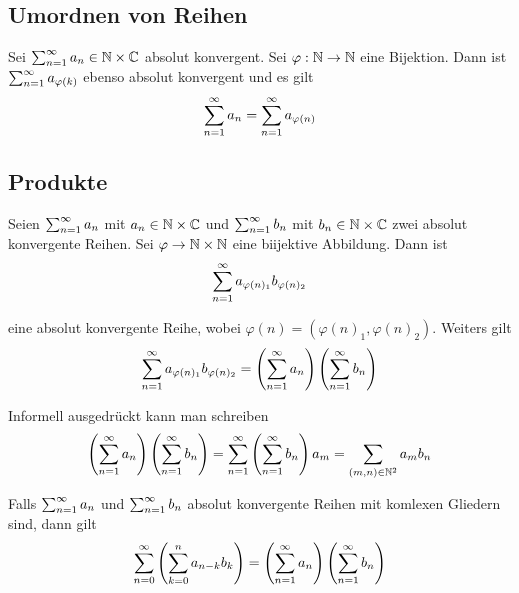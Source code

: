 
\subsection{Umordnen von Reihen}

\setcounter{thm}{34}
\begin{thm}
	Sei $\sum_{n=1}^{\infty} a_n \in \mathbb{N} \times \mathbb{C}$ absolut konvergent. Sei $\varphi: \mathbb{N} \to \mathbb{N}$ eine Bijektion. Dann ist $\sum_{n=1}^{\infty} a_{\varphi(k)}$ ebenso absolut konvergent und es gilt
	\begin{equation}
		\sum_{n=1}^{\infty} a_n = \sum_{n=1}^{\infty} a_{\varphi(n)}
	\end{equation}
\end{thm}

\subsection{Produkte} 

\begin{thm}
	
	Seien $\sum_{n=1}^{\infty} a_n$ mit $a_n \in \mathbb{N} \times \mathbb{C}$ und $\sum_{n=1}^{\infty} b_n$ mit $b_n \in \mathbb{N} \times \mathbb{C}$ zwei absolut konvergente Reihen. Sei $\varphi \to \mathbb{N} \times \mathbb{N}$ eine biijektive Abbildung. Dann ist
	\begin{equation}
		\sum_{n=1}^{\infty} a_{\varphi(n)_1} b_{\varphi(n)_2} 
	\end{equation}
	
	eine absolut konvergente Reihe, wobei $\varphi (n) = (\varphi(n)_1, \varphi(n)_2)$. Weiters gilt
	\begin{equation}
		\sum_{n=1}^{\infty} a_{\varphi(n)_1} b_{\varphi(n)_2} = \left( \sum_{n=1}^{\infty} a_n \right) \left( \sum_{n=1}^{\infty} b_n \right)
	\end{equation}
	
	Informell ausgedrückt kann man schreiben
	\begin{equation}
		\left( \sum_{n=1}^{\infty} a_n \right) \left( \sum_{n=1}^{\infty} b_n \right) =
	  \sum_{n=1}^{\infty} \left( \sum_{n=1}^{\infty} b_n \right) a_m =
	  \sum_{(m,n) \in \mathbb{N}^2} a_m b_n
	\end{equation}
\end{thm}


\setcounter{thm}{36}
\begin{thm}
	Falls $\sum_{n=1}^{\infty} a_n$ und $\sum_{n=1}^{\infty} b_n$ absolut konvergente Reihen mit komlexen Gliedern sind, dann gilt
	\begin{equation}
		\sum_{n=0}^{\infty} \left ( \sum_{k=0}^{n} a_{n-k} b_k \right )
		=\left( \sum_{n=1}^{\infty} a_n \right) \left( \sum_{n=1}^{\infty} b_n \right)
	\end{equation}
\end{thm}

